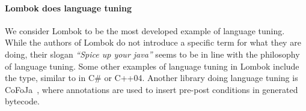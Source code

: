 \paragraph{Lombok does language tuning}
We consider Lombok to be the most developed example of language
tuning.  While the authors of Lombok do not introduce a specific term
for what they are doing, their slogan \emph{``Spice up your java''}
seems to be in line with the philosophy of language tuning. Some
other examples of language tuning in Lombok include the \Q@val@ type,
similar to \Q@auto@ in C\# or C++04.  Another library doing language
tuning is CoFoJa~\cite{cofoja}, where annotations are used to insert
pre-post conditions in generated bytecode.


